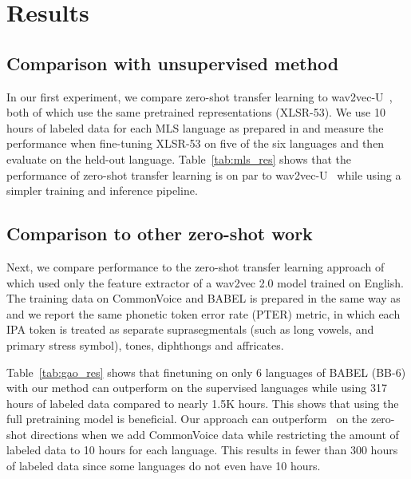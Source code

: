 \documentclass{article}
\begin{document}

\section{Results}
\label{sec:res}

\subsection{Comparison with unsupervised method}


In our first experiment, we compare zero-shot transfer learning to wav2vec-U~\cite{baevski2021unsupervised}, both of which use the same pretrained representations (XLSR-53).
We use 10 hours of labeled data for each MLS language as prepared in  \cite{conneau2020unsupervised} and measure the performance when fine-tuning XLSR-53 on five of the six languages and then evaluate on the held-out language.
Table~\ref{tab:mls_res} shows that the performance of zero-shot transfer learning is on par to wav2vec-U~\cite{baevski2021unsupervised} while using a simpler training and inference pipeline.

\subsection{Comparison to other zero-shot work}


Next, we compare performance to the zero-shot transfer learning approach of \cite{gaozero} which used only the feature extractor of a wav2vec 2.0 model trained on English.
The training data on CommonVoice and BABEL is prepared in the same way as \cite{gaozero} and we report the same phonetic token error rate (PTER) metric, in which each IPA token is treated as separate suprasegmentals (such as long vowels, and primary stress symbol), tones, diphthongs and affricates.

Table~\ref{tab:gao_res} shows that finetuning on only 6 languages of BABEL (BB-6) with our method can outperform \cite{gaozero} on the supervised languages while using 317 hours of labeled data compared to nearly 1.5K hours.
This shows that using the full pretraining model is beneficial.
Our approach can outperform~\cite{gaozero} on the zero-shot directions when we add CommonVoice data while restricting the amount of labeled data to 10 hours for each language. 
This results in fewer than 300 hours of labeled data since some languages do not even have 10 hours.
\end{document}
